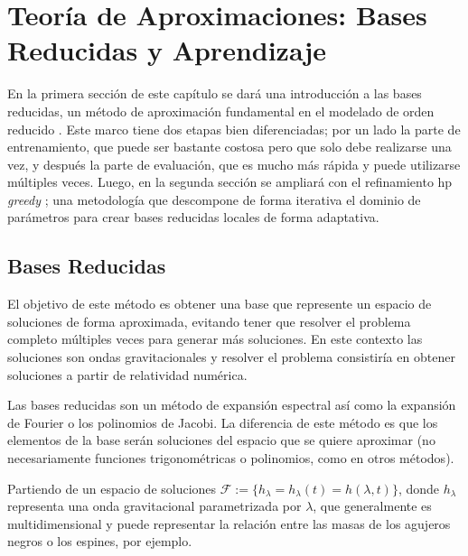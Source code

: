 \chapter{Teoría de Aproximaciones: Bases Reducidas y Aprendizaje}


En la primera sección de este capítulo se dará una introducción a las bases reducidas, un método de aproximación fundamental en el modelado de orden reducido \cite{Tiglio:2021ysj}. Este marco tiene dos etapas bien diferenciadas; por un lado la parte de entrenamiento, que puede ser bastante costosa pero que solo debe realizarse una vez, y después la parte de evaluación, que es mucho más rápida y puede utilizarse múltiples veces.
Luego, en la segunda sección se ampliará con el refinamiento hp \textit{greedy} \cite{Cerino:2022dhr}; una metodología que descompone de forma iterativa el dominio de parámetros para crear bases reducidas locales de forma adaptativa.


\section{Bases Reducidas}

El objetivo de este método es obtener una base que represente un espacio de soluciones de forma aproximada, evitando tener que resolver el problema completo múltiples veces para generar más soluciones. 
En este contexto las soluciones son ondas gravitacionales y resolver el problema consistiría en obtener soluciones a partir de relatividad numérica.

Las bases reducidas son un método de expansión espectral así como la expansión de Fourier o los polinomios de Jacobi. La diferencia de este método es que los elementos de la base serán soluciones del espacio que se quiere aproximar (no necesariamente funciones trigonométricas o polinomios, como en otros métodos).

Partiendo de un espacio de soluciones $\mathcal{F}:= \{ h_{\lambda} = h_{\lambda}(t) = h(\lambda, t)\}$, donde $h_{\lambda}$ representa una onda gravitacional parametrizada por $\lambda$, que generalmente es multidimensional y puede representar la relación entre las masas de los agujeros negros o los espines, por ejemplo.


